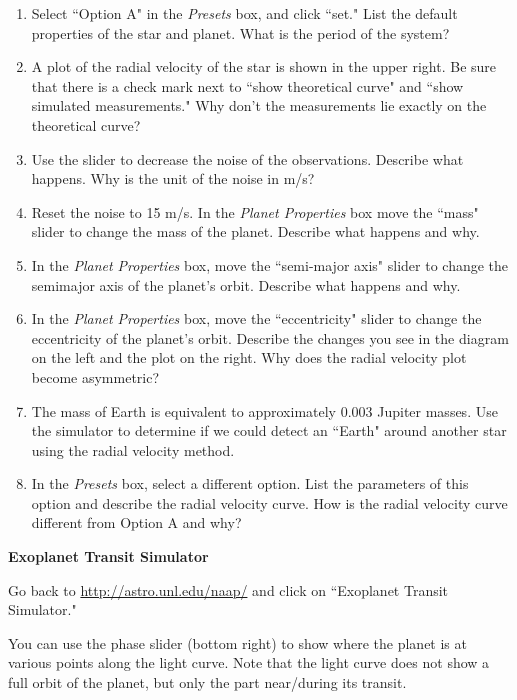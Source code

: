 \documentclass[11pt]{article}%
\begin{document}
\begin{enumerate}
\item Select ``Option A" in the \emph{Presets} box, and click ``set." List the default properties of the star and planet.  What is the period of the system?
\item A plot of the radial velocity of the star is shown in the upper right.  Be sure that there is a check mark next to ``show theoretical curve" and ``show simulated measurements."  Why don't the measurements lie exactly on the theoretical curve?
\item Use the slider to decrease the noise of the observations.  Describe what happens.  Why is the unit of the noise in m/s?
\item Reset the noise to 15 m/s.  In the \emph{Planet Properties} box move the ``mass" slider to change the mass of the planet.  Describe what happens and why.
\item In the \emph{Planet Properties} box, move the ``semi-major axis" slider to change the semimajor axis of the planet's orbit.  Describe what happens and why.
\item In the \emph{Planet Properties} box, move the ``eccentricity" slider to change the eccentricity of the planet's orbit.  Describe the changes you see in the diagram on the left and the plot on the right.  Why does the radial velocity plot become asymmetric?
\item The mass of Earth is equivalent to approximately 0.003 Jupiter masses.  Use the simulator to determine if we could detect an ``Earth" around another star using the radial velocity method.
\item In the \emph{Presets} box, select a different option.  List the parameters of this option and describe the radial velocity curve.  How is the radial velocity curve different from Option A and why?
\end{enumerate}

\noindent \textbf{Exoplanet Transit Simulator}

\vspace{0.1in}

\noindent Go back to \url{http://astro.unl.edu/naap/} and click on ``Exoplanet Transit Simulator." 

\vspace{0.1in}
\noindent You can use the phase slider (bottom right) to show where the planet is at various points along the light curve.  Note that the light curve does not show a full orbit of the planet, but only the part near/during its transit.
\end{document}
